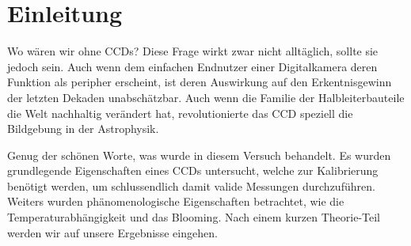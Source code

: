 \section{Einleitung}
Wo wären wir ohne CCDs? Diese Frage wirkt zwar nicht alltäglich, sollte sie jedoch sein. Auch wenn dem einfachen Endnutzer einer Digitalkamera deren Funktion als peripher erscheint, ist deren Auswirkung auf den Erkentnisgewinn der letzten Dekaden unabschätzbar. Auch wenn die Familie der Halbleiterbauteile die Welt nachhaltig verändert hat, revolutionierte das CCD speziell die Bildgebung in der Astrophysik. 

Genug der schönen Worte, was wurde in diesem Versuch behandelt. Es wurden grundlegende Eigenschaften eines CCDs untersucht, welche zur Kalibrierung benötigt werden, um schlussendlich damit valide Messungen durchzuführen. Weiters wurden phänomenologische Eigenschaften betrachtet, wie die Temperaturabhängigkeit und das Blooming. Nach einem kurzen Theorie-Teil werden wir auf unsere Ergebnisse eingehen.